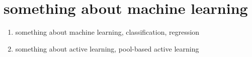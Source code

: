 \chapter{something about machine learning}

\begin{enumerate}
    \item something about machine learning, classification, regression
    \item something about active learning, pool-based active learning
\end{enumerate}
